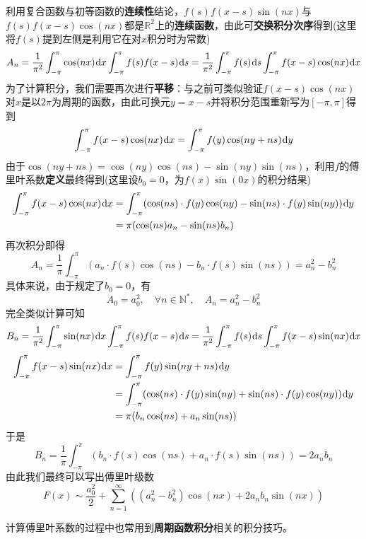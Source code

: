 \documentclass[a4paper,UTF8,fontset=windows,AutoFakeBold]{ctexart}
\newcommand*{\dr}{\hspace{0.07em}\mathrm{d}}
\newcommand*{\rb}{\mathbb{R}}
\newcommand*{\suminf}[1][n=1]{\sum_{#1}^\infty}
\newcommand*{\note}{\noindent *}
\theoremstyle{ex}
\begin{document}
\begin{framed}
{\begin{itemize}
        利用复合函数与初等函数的\textbf{连续性}结论，$f(s)f(x-s)\sin(nx)$与$f(s)f(x-s)\cos(nx)$都是$\rb^2$上的\textbf{连续函数}，由此可\textbf{交换积分次序}得到(这里将$f(s)$提到左侧是利用它在对$x$积分时为常数)
        $$A_n=\frac{1}{\pi^2}\int_{-\pi}^\pi\cos(nx)\dr x\int_{-\pi}^\pi f(s)f(x-s)\dr s=\frac{1}{\pi^2}\int_{-\pi}^\pi f(s)\dr s\int_{-\pi}^\pi f(x-s)\cos(nx)\dr x$$
        为了计算积分，我们需要再次进行\textbf{平移}：与之前可类似验证$f(x-s)\cos(nx)$对$x$是以$2\pi$为周期的函数，由此可换元$y=x-s$并将积分范围重新写为$[-\pi,\pi]$得到
        $$\int_{-\pi}^\pi f(x-s)\cos(nx)\dr x=\int_{-\pi}^\pi f(y)\cos(ny+ns)\dr y$$
        由于$\cos(ny+ns)=\cos(ny)\cos(ns)-\sin(ny)\sin(ns)$，利用$f$的傅里叶系数\textbf{定义}最终得到(这里设$b_0=0$，为$f(x)\sin(0x)$的积分结果)
        $$\begin{aligned}\int_{-\pi}^\pi f(x-s)\cos(nx)\dr x&=\int_{-\pi}^\pi(\cos(ns)\cdot f(y)\cos(ny)-\sin(ns)\cdot f(y)\sin(ny))\dr y\\ &=\pi(\cos(ns)a_n-\sin(ns)b_n)\end{aligned}$$
        再次积分即得
        $$A_n=\frac{1}{\pi}\int_{-\pi}^\pi(a_n\cdot f(s)\cos(ns)-b_n\cdot f(s)\sin(ns))=a_n^2-b_n^2$$
        具体来说，由于规定了$b_0=0$，有
        $$A_0=a_0^2,\quad\forall n\in\mathbb{N}^*,\quad A_n=a_n^2-b_n^2$$
        完全类似计算可知
        $$B_n=\frac{1}{\pi^2}\int_{-\pi}^\pi\sin(nx)\dr x\int_{-\pi}^\pi f(s)f(x-s)\dr s=\frac{1}{\pi^2}\int_{-\pi}^\pi f(s)\dr s\int_{-\pi}^\pi f(x-s)\sin(nx)\dr x$$
        $$\begin{aligned}\int_{-\pi}^\pi f(x-s)\sin(nx)\dr x&=\int_{-\pi}^\pi f(y)\sin(ny+ns)\dr y\\ &=\int_{-\pi}^\pi(\cos(ns)\cdot f(y)\sin(ny)+\sin(ns)\cdot f(y)\cos(ny))\dr y\\ &=\pi(b_n\cos(ns)+a_n\sin(ns))\end{aligned}$$
        于是
        $$B_n=\frac{1}{\pi}\int_{-\pi}^\pi(b_n\cdot f(s)\cos(ns)+a_n\cdot f(s)\sin(ns))=2a_nb_n$$
        由此我们最终可以写出傅里叶级数
        $$F(x)\sim\frac{a_0^2}{2}+\suminf((a_n^2-b_n^2)\cos(nx)+2a_nb_n\sin(nx))$$
    \end{itemize}
}
\end{framed}

\note 计算傅里叶系数的过程中也常用到\textbf{周期函数积分}相关的积分技巧。
\end{document}
